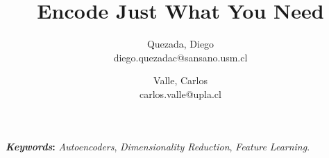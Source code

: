 \documentclass[twocolumn]{article}
\title{\textbf{Encode Just What You Need}}
\author{Quezada, Diego \\ diego.quezadac@sansano.usm.cl \and Valle, Carlos \\ carlos.valle@upla.cl}
\begin{document}
\sloppy %

\maketitle



\textbf{\textit{Keywords}:} \textit{Autoencoders}, \textit{Dimensionality Reduction}, \textit{Feature Learning}.



% 



% 

% 

% 

% 

\newpage


\end{document}

